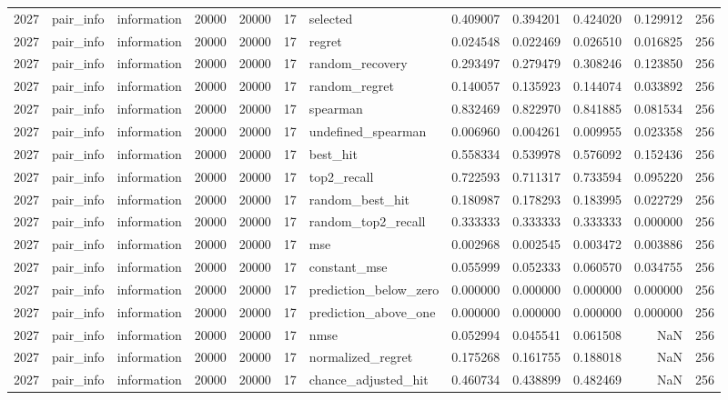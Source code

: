 \begin{tabular}{rllrrrlrrrrr}
2027 & pair_info & information & 20000 & 20000 & 17 & selected & 0.409007 & 0.394201 & 0.424020 & 0.129912 & 256 \\
2027 & pair_info & information & 20000 & 20000 & 17 & regret & 0.024548 & 0.022469 & 0.026510 & 0.016825 & 256 \\
2027 & pair_info & information & 20000 & 20000 & 17 & random_recovery & 0.293497 & 0.279479 & 0.308246 & 0.123850 & 256 \\
2027 & pair_info & information & 20000 & 20000 & 17 & random_regret & 0.140057 & 0.135923 & 0.144074 & 0.033892 & 256 \\
2027 & pair_info & information & 20000 & 20000 & 17 & spearman & 0.832469 & 0.822970 & 0.841885 & 0.081534 & 256 \\
2027 & pair_info & information & 20000 & 20000 & 17 & undefined_spearman & 0.006960 & 0.004261 & 0.009955 & 0.023358 & 256 \\
2027 & pair_info & information & 20000 & 20000 & 17 & best_hit & 0.558334 & 0.539978 & 0.576092 & 0.152436 & 256 \\
2027 & pair_info & information & 20000 & 20000 & 17 & top2_recall & 0.722593 & 0.711317 & 0.733594 & 0.095220 & 256 \\
2027 & pair_info & information & 20000 & 20000 & 17 & random_best_hit & 0.180987 & 0.178293 & 0.183995 & 0.022729 & 256 \\
2027 & pair_info & information & 20000 & 20000 & 17 & random_top2_recall & 0.333333 & 0.333333 & 0.333333 & 0.000000 & 256 \\
2027 & pair_info & information & 20000 & 20000 & 17 & mse & 0.002968 & 0.002545 & 0.003472 & 0.003886 & 256 \\
2027 & pair_info & information & 20000 & 20000 & 17 & constant_mse & 0.055999 & 0.052333 & 0.060570 & 0.034755 & 256 \\
2027 & pair_info & information & 20000 & 20000 & 17 & prediction_below_zero & 0.000000 & 0.000000 & 0.000000 & 0.000000 & 256 \\
2027 & pair_info & information & 20000 & 20000 & 17 & prediction_above_one & 0.000000 & 0.000000 & 0.000000 & 0.000000 & 256 \\
2027 & pair_info & information & 20000 & 20000 & 17 & nmse & 0.052994 & 0.045541 & 0.061508 & NaN & 256 \\
2027 & pair_info & information & 20000 & 20000 & 17 & normalized_regret & 0.175268 & 0.161755 & 0.188018 & NaN & 256 \\
2027 & pair_info & information & 20000 & 20000 & 17 & chance_adjusted_hit & 0.460734 & 0.438899 & 0.482469 & NaN & 256 \\

\end{tabular}
